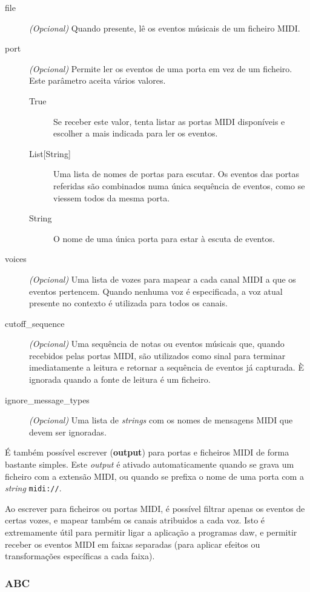 \begin{description}
 \item[file] \textit{(Opcional)} Quando presente, lê os eventos músicais de um ficheiro MIDI.
 \item[port] \textit{(Opcional)} Permite ler os eventos de uma porta em vez de um ficheiro. Este parâmetro aceita vários valores.
 \begin{description}
  \item[True] Se receber este valor, tenta listar as portas MIDI disponíveis e escolher a mais indicada para ler os eventos.
  \item[List{[String]}] Uma lista de nomes de portas para escutar. Os eventos das portas referidas são combinados numa única sequência de eventos, como se viessem todos da mesma porta.
  \item[String] O nome de uma única porta para estar à escuta de eventos.
 \end{description}
 \item[voices] \textit{(Opcional)} Uma lista de vozes para mapear a cada canal MIDI a que os eventos pertencem. Quando nenhuma voz é especificada, a voz atual presente no contexto é utilizada para todos os canais.
 \item[cutoff\_sequence] \textit{(Opcional)} Uma sequência de notas ou eventos músicais que, quando recebidos pelas portas MIDI, são utilizados como sinal para terminar imediatamente a leitura e retornar a sequência de eventos já capturada. È ignorada quando a fonte de leitura é um ficheiro.
 \item[ignore\_message\_types] \textit{(Opcional)} Uma lista de \textit{strings} com os nomes de mensagens MIDI que devem ser ignoradas.
\end{description}

É também possível escrever (\textbf{output}) para portas e ficheiros MIDI de forma bastante simples. Este \textit{output} é ativado automaticamente quando se grava um ficheiro com a extensão MIDI, ou quando se prefixa o nome de uma porta com a \textit{string} \texttt{midi://}.

Ao escrever para ficheiros ou portas MIDI, é possível filtrar apenas os eventos de certas vozes, e mapear também os canais atribuidos a cada voz. Isto é extremamente útil para permitir ligar a aplicação a programas \acrshort{daw}, e permitir receber os eventos MIDI em faixas separadas (para aplicar efeitos ou transformações específicas a cada faixa).

\subsubsection{ABC}


